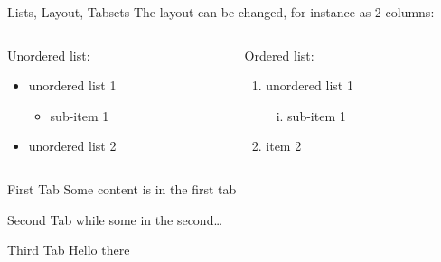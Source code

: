 \documentclass[
  ignorenonframetext,
  aspectratio=169,
]{beamer}
\providecommand{\tightlist}{%
  \setlength{\itemsep}{0pt}\setlength{\parskip}{0pt}}\usepackage{longtable,booktabs,array}
\theoremstyle{plain}
\theoremstyle{remark}
\begin{document}
\begin{frame}{Lists, Layout, Tabsets}
\label{lists-layout-tabsets}
The layout can be changed, for instance as 2 columns:

\begin{columns}[T]
\begin{column}{0.5\textwidth}
Unordered list:

\begin{itemize}
\tightlist
\item
  unordered list 1

  \begin{itemize}
  \tightlist
  \item
    sub-item 1
  \end{itemize}
\item
  unordered list 2
\end{itemize}
\end{column}

\begin{column}{0.5\textwidth}
Ordered list:

\begin{enumerate}
\tightlist
\item
  unordered list 1

  \begin{enumerate}
  [i)]
  \tightlist
  \item
    sub-item 1
  \end{enumerate}
\item
  item 2
\end{enumerate}
\end{column}
\end{columns}

\begin{block}{First Tab}
Some content is in the first tab
\end{block}

\begin{block}{Second Tab}
while some in the second\ldots{}
\end{block}

\begin{block}{Third Tab}
Hello there
\end{block}
\end{frame}
\end{document}
